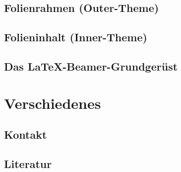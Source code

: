 \subsection{Folienrahmen (Outer-Theme)}




\subsection{Folieninhalt (Inner-Theme)}


\subsection{Das \LaTeX-Beamer-Grundgerüst}




\section{Verschiedenes}
\subsection{Kontakt}


\subsection{Literatur}



\section{}


